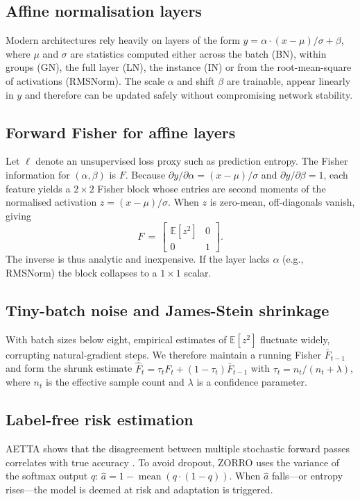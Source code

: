 \documentclass{article} %
\begin{document}
\subsection{Affine normalisation layers}
Modern architectures rely heavily on layers of the form \(y = \alpha\cdot(x - \mu)/\sigma + \beta\), where \(\mu\) and \(\sigma\) are statistics computed either across the batch (BN), within groups (GN), the full layer (LN), the instance (IN) or from the root-mean-square of activations (RMSNorm). The scale \(\alpha\) and shift \(\beta\) are trainable, appear linearly in \(y\) and therefore can be updated safely without compromising network stability.
\subsection{Forward Fisher for affine layers}
Let \(\ell\) denote an unsupervised loss proxy such as prediction entropy. The Fisher information for \((\alpha, \beta)\) is \(F\). Because \(\partial y/\partial \alpha = (x - \mu)/\sigma\) and \(\partial y/\partial \beta = 1\), each feature yields a \(2\times2\) Fisher block whose entries are second moments of the normalised activation \(z = (x - \mu)/\sigma\). When \(z\) is zero-mean, off-diagonals vanish, giving
\[
F \,=\, \begin{bmatrix} \mathbb{E}[z^2] & 0 \\ 0 & 1 \end{bmatrix}.
\]
The inverse is thus analytic and inexpensive. If the layer lacks \(\alpha\) (e.g., RMSNorm) the block collapses to a \(1\times1\) scalar.
\subsection{Tiny-batch noise and James-Stein shrinkage}
With batch sizes below eight, empirical estimates of \(\mathbb{E}[z^2]\) fluctuate widely, corrupting natural-gradient steps. We therefore maintain a running Fisher \(\bar{F}_{t-1}\) and form the shrunk estimate \(\hat{F}_{t} = \tau_{t} F_{t} + (1 - \tau_{t})\bar{F}_{t-1}\) with \(\tau_{t} = n_{t} /(n_{t} + \lambda)\), where \(n_{t}\) is the effective sample count and \(\lambda\) is a confidence parameter.
\subsection{Label-free risk estimation}
AETTA shows that the disagreement between multiple stochastic forward passes correlates with true accuracy \cite{lee-2024-aetta}. To avoid dropout, ZORRO uses the variance of the softmax output \(q\): \(\hat{a} = 1 - \operatorname{mean}(q\cdot(1 - q))\). When \(\hat{a}\) falls—or entropy rises—the model is deemed at risk and adaptation is triggered.
\end{document}
